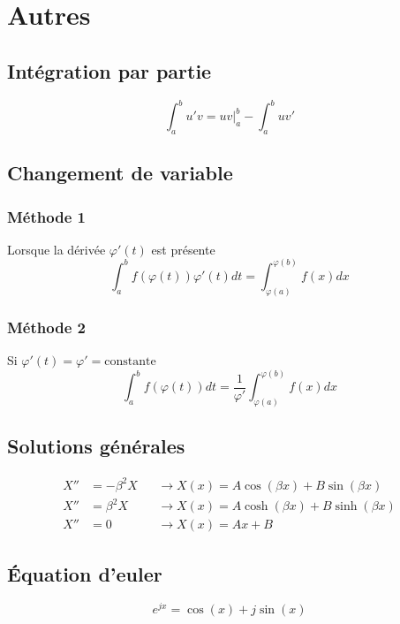 \documentclass[resume]{subfiles}
\begin{document}
\section{Autres}
\label{sec_autres}
\subsection{Intégration par partie}
$$\int_{a}^{b}u'v=uv\Big|_{a}^{b}-\int_{a}^{b}uv'$$
\subsection{Changement de variable}
\subsubsection{Méthode 1}
Lorsque la dérivée $\varphi'(t)$ est présente 
$$\int_{a}^{b}f(\varphi(t))\varphi'(t)dt=\int_{\varphi(a)}^{\varphi(b)}f(x)dx$$
\subsubsection{Méthode 2}
Si $\varphi'(t)=\varphi'=\text{constante}$
$$\int_{a}^{b}f(\varphi(t))dt=\frac{1}{\varphi'}\int_{\varphi(a)}^{\varphi(b)}f(x)dx$$
\subsection{Solutions générales}
\begin{align*}
X''&=-\beta^2 X&&\longrightarrow X(x)=A\cos(\beta x)+B\sin(\beta x)\\
X''&=\beta^2 X&&\longrightarrow X(x)=A\cosh(\beta x)+B\sinh(\beta x)\\
X''&=0 &&\longrightarrow X(x)=Ax+B
\end{align*}
\subsection{Équation d'euler}
$$e^{jx}=\cos(x)+j\sin(x)$$
\end{document}

